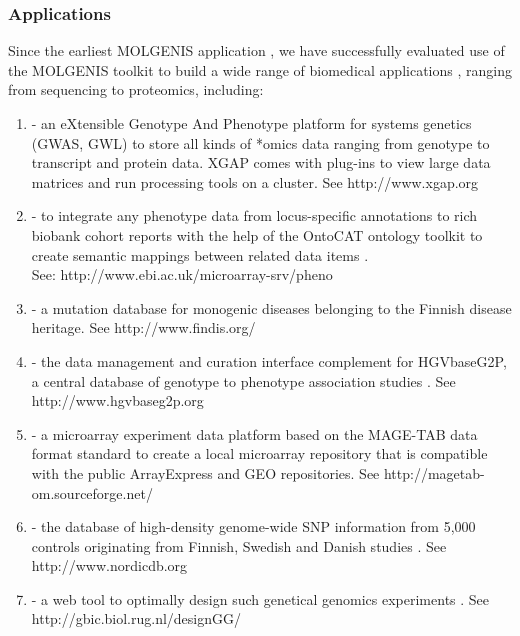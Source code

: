 \subsubsection{Applications}
Since the earliest MOLGENIS application \cite{Swertz:2004}, we have successfully evaluated use of the MOLGENIS 
toolkit to build a wide range of biomedical applications \cite{Swertz:2010a, Fredman:2002, Leu:2010, Li:2009, Smedley:2008}, 
ranging from sequencing to proteomics, including:

\begin{enumerate}\itemsep1pt
\item {} - an eXtensible Genotype And Phenotype platform \cite{Swertz:2010a} for systems genetics 
(GWAS, GWL) to store all kinds of *omics data ranging from genotype to transcript and protein 
data. XGAP comes with plug-ins to view large data matrices and run processing tools on a cluster. 
See http://www.xgap.org
\item {} - to integrate any phenotype data from locus-specific annotations to 
rich biobank cohort reports with the help of the OntoCAT ontology toolkit to create semantic 
mappings between related data items \cite{Kurbatova:2011}.\\
See: http://www.ebi.ac.uk/microarray-srv/pheno
\item {} - a mutation database for monogenic diseases belonging to the Finnish 
disease heritage. See http://www.findis.org/
\item {} - the data management and curation interface complement for HGVbaseG2P, 
a central database of genotype to phenotype association studies \cite{Fredman:2002}. See http://www.hgvbaseg2p.org
\item {} - a microarray experiment data platform based on the MAGE-TAB data format 
standard to create a local microarray repository that is compatible with the public ArrayExpress 
and GEO repositories. See http://magetab-om.sourceforge.net/ 
\item {} - the database of high-density genome-wide SNP information from 5,000 
controls originating from Finnish, Swedish and Danish studies \cite{Leu:2010}. See http://www.nordicdb.org
\item {} - a web tool to optimally design such genetical genomics experiments \cite{Li:2009}. 
See http://gbic.biol.rug.nl/designGG/
\end{enumerate}


